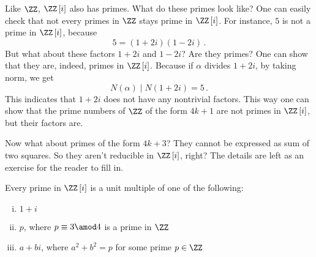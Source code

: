 \documentclass[11pt]{scrartcl}
\begin{document}
Like \(\ZZ\), \(\ZZ \left[i\right] \) also has primes. What do these primes look like? One can easily check that not every primes in \(\ZZ\) stays prime in \(\ZZ \left[i\right] \). For instance, \(5\) is not a prime in \(\ZZ \left[i\right] \), because
\[ 5 = \left(1+2i\right) \left(1-2i\right) \,. \]
But what about these factors \(1+2i\) and \(1-2i\)? Are they primes? One can show that they are, indeed, primes in \(\ZZ \left[i\right] \). Because if \(\alpha\) divides \(1+2i\), by taking norm, we get
\[ N \left(\alpha\right) \mid N \left(1+2i\right) = 5 \,. \]
This indicates that \(1+2i\) does not have any nontrivial factors. This way one can show that the prime numbers of \(\ZZ\) of the form \(4k+1\) are not primes in \(\ZZ \left[i\right] \), but their factors are.

Now what about primes of the form \(4k+3\)? They cannot be expressed as sum of two squares. So they aren't reducible in \(\ZZ \left[i\right] \), right? The details are left as an exercise for the reader to fill in.

\begin{theorem}\label{thm:primes_in_gaussian}
Every prime in \(\ZZ \left[i\right] \) is a unit multiple of one of the following:
\begin{enumerate}[(i)]
\item \(1+i\)
\item \(p\), where \(p \equiv 3 \amod 4\) is a prime in \(\ZZ\)
\item \(a+bi\), where \(a^2+b^2 = p\) for some prime \(p \in \ZZ\)
\end{enumerate}
\end{theorem}
\end{document}

